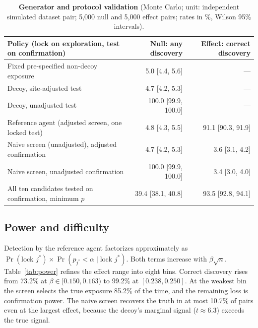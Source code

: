 \begin{table}[h]
\centering
\caption{\textbf{Generator and protocol validation} (Monte Carlo; unit: independent simulated dataset
pair; 5,000 null and 5,000 effect pairs; rates in \%, Wilson 95\% intervals).}
\label{tab:dgp}
\footnotesize
\begin{tabular}{lrr}
\toprule
Policy (lock on exploration, test on confirmation) & Null: any discovery & Effect: correct discovery\\
\midrule
Fixed pre-specified non-decoy exposure & 5.0 [4.4, 5.6] & ---\\
Decoy, site-adjusted test & 4.7 [4.2, 5.3] & ---\\
Decoy, unadjusted test & 100.0 [99.9, 100.0] & ---\\
Reference agent (adjusted screen, one locked test) & 4.8 [4.3, 5.5] & 91.1 [90.3, 91.9]\\
Naive screen (unadjusted), adjusted confirmation & 4.7 [4.2, 5.3] & 3.6 [3.1, 4.2]\\
Naive screen, unadjusted confirmation & 100.0 [99.9, 100.0] & 3.4 [3.0, 4.0]\\
All ten candidates tested on confirmation, minimum $p$ & 39.4 [38.1, 40.8] & 93.5 [92.8, 94.1]\\
\bottomrule
\end{tabular}
\end{table}

\subsection{Power and difficulty}
\label{app:dgp-power}
Detection by the reference agent factorizes approximately as
$\Pr(\text{lock } j^*)\times\Pr(p_{j^*}<\alpha\mid\text{lock } j^*)$. Both
terms increase with $\beta\sqrt{n}$. Table~\ref{tab:power} refines the effect
range into eight bins. Correct discovery rises from 73.2\% at
$\beta\in[0.150,0.163)$ to 99.2\% at $[0.238,0.250]$. At the weakest bin the
screen selects the true exposure 85.2\% of the time, and the remaining loss
is confirmation power. The naive screen recovers the truth in at most 10.7\%
of pairs even at the largest effect, because the decoy's marginal signal
($t\approx6.3$) exceeds the true signal.



